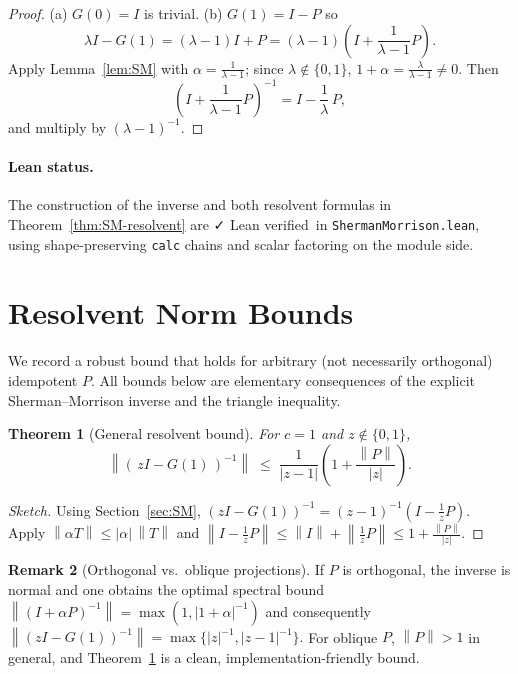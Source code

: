 \documentclass[11pt]{article}
\newtheorem{theorem}{Theorem}[section]
\theoremstyle{definition}
\newtheorem{remark}[theorem]{Remark}
\newcommand{\norm}[1]{\left\lVert #1\right\rVert}
\newcommand{\leanok}{\textsf{\small \textcolor{green!60!black}{✓ Lean verified}}}
\begin{document}
\begin{proof}
(a) $G(0)=I$ is trivial. (b) $G(1)=I-P$ so
\[
\lambda I - G(1)=(\lambda-1)I+P=(\lambda-1)\left(I + \frac{1}{\lambda-1}P\right).
\]
Apply Lemma~\ref{lem:SM} with $\alpha=\frac{1}{\lambda-1}$; since $\lambda\notin\{0,1\}$, $1+\alpha=\frac{\lambda}{\lambda-1}\neq 0$. Then
\[
\left(I+\frac{1}{\lambda-1}P\right)^{-1}
= I - \frac{1}{\lambda}\,P,
\]
and multiply by $(\lambda-1)^{-1}$.
\end{proof}

\paragraph{Lean status.} The construction of the inverse and both resolvent formulas in Theorem~\ref{thm:SM-resolvent} are \leanok\ in \texttt{ShermanMorrison.lean}, using shape-preserving \texttt{calc} chains and scalar factoring on the module side.

\section{Resolvent Norm Bounds}\label{sec:norms}

We record a robust bound that holds for arbitrary (not necessarily orthogonal) idempotent $P$.
All bounds below are elementary consequences of the explicit Sherman--Morrison inverse and the triangle inequality.

\begin{theorem}[General resolvent bound]\label{thm:bound-general}
For $c=1$ and $z\notin\{0,1\}$,
\[
\norm{(\,zI - G(1)\,)^{-1}} \;\le\; \frac{1}{|z-1|}\left(1 + \frac{\norm{P}}{|z|}\right).
\]
\end{theorem}

\begin{proof}[Sketch]
Using Section~\ref{sec:SM}, $(zI - G(1))^{-1}=(z-1)^{-1}\left(I - \frac{1}{z}P\right)$. Apply $\norm{\alpha T}\le |\alpha|\,\norm{T}$ and $\norm{I - \frac{1}{z}P}\le \norm{I} + \norm{\frac{1}{z}P}\le 1 + \frac{\norm{P}}{|z|}$.
\end{proof}

\begin{remark}[Orthogonal vs.\ oblique projections]
If $P$ is orthogonal, the inverse is normal and one obtains the optimal spectral bound
\(
\norm{(I+\alpha P)^{-1}}=\max(1,|1+\alpha|^{-1})
\)
and consequently
\(
\norm{(zI-G(1))^{-1}}=\max\{|z|^{-1},|z-1|^{-1}\}.
\)
For oblique $P$, $\norm{P}>1$ in general, and Theorem~\ref{thm:bound-general} is a clean, implementation-friendly bound.
\end{remark}
\end{document}
